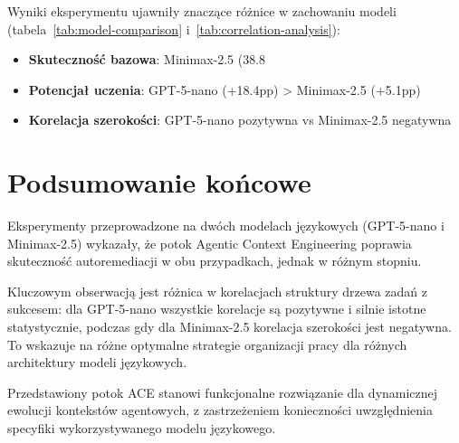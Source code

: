 Wyniki eksperymentu ujawniły znaczące różnice w zachowaniu modeli (tabela~\ref{tab:model-comparison} i~\ref{tab:correlation-analysis}):
\begin{itemize}
    \item \textbf{Skuteczność bazowa}: Minimax-2.5 (38.8%
    \item \textbf{Potencjał uczenia}: GPT-5-nano (+18.4pp) > Minimax-2.5 (+5.1pp)
    \item \textbf{Korelacja szerokości}: GPT-5-nano pozytywna vs Minimax-2.5 negatywna
\end{itemize}

\section{Podsumowanie końcowe}

Eksperymenty przeprowadzone na dwóch modelach językowych (GPT-5-nano i Minimax-2.5) wykazały, że potok Agentic Context Engineering poprawia skuteczność autoremediacji w obu przypadkach, jednak w różnym stopniu. 

Kluczowym obserwacją jest różnica w korelacjach struktury drzewa zadań z sukcesem: dla GPT-5-nano wszystkie korelacje są pozytywne i silnie istotne statystycznie, podczas gdy dla Minimax-2.5 korelacja szerokości jest negatywna. To wskazuje na różne optymalne strategie organizacji pracy dla różnych architektury modeli językowych.

Przedstawiony potok ACE stanowi funkcjonalne rozwiązanie dla dynamicznej ewolucji kontekstów agentowych, z zastrzeżeniem konieczności uwzględnienia specyfiki wykorzystywanego modelu językowego.